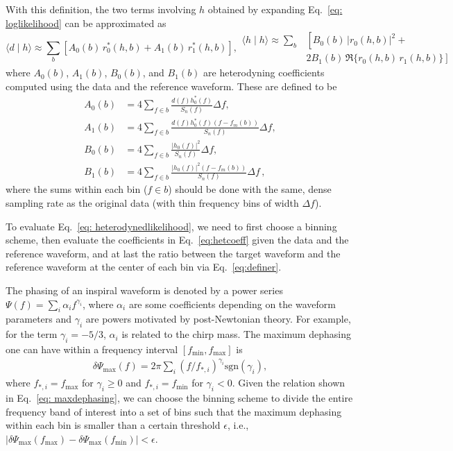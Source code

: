 \documentclass[twocolumn]{aastex631}
\begin{document}
With this definition, the two terms involving $h$ obtained by expanding
Eq.~\eqref{eq: loglikelihood} can be approximated as
\begin{subequations} \label{eq: heterodynedlikelihood}
\begin{equation}
    \langle d \mid h \rangle \approx \sum_b \left[ A_0(b)\, r^*_0(h,b) + A_1(b)\, r^*_1(h,b) \right] ,
\end{equation}
\begin{align}
    \langle h \mid h \rangle \approx \sum_b &\left[ B_0(b)\, |r_0(h,b)|^2 + \right. \nonumber \\
    &\left. 2 B_1(b)\, \Re\{r_0(h,b)\, r_1(h,b)\} \right] 
\end{align}
\end{subequations} 
where $A_0(b)$, $A_1(b)$, $B_0(b)$, and $B_1(b)$ are heterodyning coefficients
computed using the data and the reference waveform. These are defined to be
\begin{subequations} \label{eq:hetcoeff}
\begin{align}
    A_0(b) &= 4 \sum_{f \in b} \frac{d(f)h^*_0(f)}{S_n(f)} \Delta f, \\
    A_1(b) &= 4 \sum_{f \in b} \frac{d(f)h^*_0(f)(f-f_m(b))}{S_n(f)} \Delta f, \\
    B_0(b) &= 4 \sum_{f \in b} \frac{|h_0(f)|^2}{S_n(f)} \Delta f, \\
    B_1(b) &= 4 \sum_{f \in b} \frac{|h_0(f)|^2(f-f_m(b))}{S_n(f)} \Delta f\, ,
\end{align}
\end{subequations}
where the sums within each bin ($f \in b$) should be done with the same, dense
sampling rate as the original data (with thin frequency bins of width $\Delta f$).

To evaluate Eq.~\eqref{eq: heterodynedlikelihood}, we need to first choose a
binning scheme, then evaluate the coefficients in Eq.~\eqref{eq:hetcoeff} given
the data and the reference waveform, and at last the ratio between the target
waveform and the reference waveform at the center of each bin via
Eq.~\eqref{eq:definer}.

The phasing of an inspiral waveform is denoted by a power series
$\Psi(f) = \sum_i \alpha_i f^{\gamma_i}$, where $\alpha_i$ are some
coefficients depending on the waveform parameters and $\gamma_i$ are powers
motivated by post-Newtonian theory. For example, for the term $\gamma_i =
-5/3$, $\alpha_i$ is related to the chirp mass. The maximum dephasing one can
have within a frequency interval $[f_{\textrm{min}},f_{\textrm{max}}]$ is 
\begin{align}
    \delta \Psi_{\textrm{max}}(f) = 2\pi \sum_{i} (f/f_{*,i})^{\gamma_i} \textrm{sgn}(\gamma_i),
\label{eq: maxdephasing}
\end{align}
where $f_{*,i} = f_{\textrm{max}}$ for $\gamma_i \geq 0$ and $f_{*,i} =
f_{\textrm{min}}$ for $\gamma_i<0$. Given the relation shown in Eq.~\eqref{eq:
maxdephasing}, we can choose the binning scheme to divide the entire frequency
band of interest into a set of bins such that the maximum dephasing within each
bin is smaller than a certain threshold $\epsilon$, i.e.,
$|\delta\Psi_{\textrm{max}}(f_{\textrm{max}}) -
\delta\Psi_{\textrm{max}}(f_{\textrm{min}})| < \epsilon$. 
\end{document}
